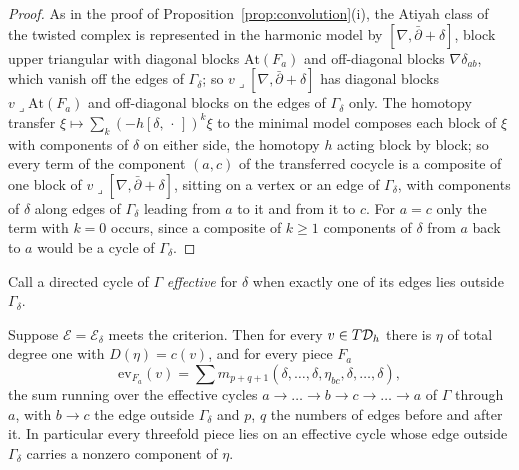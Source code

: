 \begin{proof}
As in the proof of Proposition~\ref{prop:convolution}(i), the Atiyah class of the twisted complex is represented in the harmonic model by $[\nabla,\bar\partial+\delta]$, block upper triangular with diagonal blocks $\mathrm{At}(F_{a})$ and off-diagonal blocks $\nabla\delta_{ab}$, which vanish off the edges of $\Gamma_{\delta}$; so $v\lrcorner[\nabla,\bar\partial+\delta]$ has diagonal blocks $v\lrcorner\mathrm{At}(F_{a})$ and off-diagonal blocks on the edges of $\Gamma_{\delta}$ only. The homotopy transfer $\xi\mapsto\sum_{k}(-h[\delta,\,\cdot\,])^{k}\xi$ to the minimal model composes each block of $\xi$ with components of $\delta$ on either side, the homotopy $h$ acting block by block; so every term of the component $(a,c)$ of the transferred cocycle is a composite of one block of $v\lrcorner[\nabla,\bar\partial+\delta]$, sitting on a vertex or an edge of $\Gamma_{\delta}$, with components of $\delta$ along edges of $\Gamma_{\delta}$ leading from $a$ to it and from it to $c$. For $a=c$ only the term with $k=0$ occurs, since a composite of $k\ge1$ components of $\delta$ from $a$ back to $a$ would be a cycle of $\Gamma_{\delta}$.
\end{proof}

Call a directed cycle of $\Gamma$ \emph{effective} for $\delta$ when exactly one of its edges lies outside $\Gamma_{\delta}$.

\begin{proposition}\label{prop:effective}
Suppose $\mathcal{E}=\mathcal{E}_{\delta}$ meets the criterion. Then for every $v\in T\mathcal{D}_{h}$ there is $\eta$ of total degree one with $D(\eta)=c(v)$, and for every piece $F_{a}$
\[
\mathrm{ev}_{F_{a}}(v)=\sum m_{p+q+1}(\delta,\dots,\delta,\eta_{bc},\delta,\dots,\delta),
\]
the sum running over the effective cycles $a\to\dots\to b\to c\to\dots\to a$ of $\Gamma$ through $a$, with $b\to c$ the edge outside $\Gamma_{\delta}$ and $p$, $q$ the numbers of edges before and after it. In particular every threefold piece lies on an effective cycle whose edge outside $\Gamma_{\delta}$ carries a nonzero component of $\eta$.
\end{proposition}

